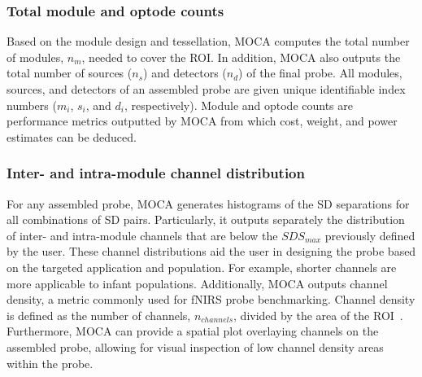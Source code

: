\subsubsection{Total module and optode counts}
Based on the module design and tessellation, \ac{MOCA} computes the total number of modules, $n_m$, needed to cover the \ac{ROI}. In addition, \ac{MOCA} also outputs the total number of sources ($n_s$) and detectors ($n_d$) of the final probe. All modules, sources, and detectors of an assembled probe are given unique identifiable index numbers ($m_i$, $s_i$, and $d_i$, respectively). Module and optode counts are performance metrics outputted by \ac{MOCA} from which cost, weight, and power estimates can be deduced.

\subsubsection{Inter- and intra-module channel distribution}
For any assembled probe, \ac{MOCA} generates histograms of the \ac{SD} separations for all combinations of \ac{SD} pairs. Particularly, it outputs separately the distribution of inter- and intra-module channels that are below the $SDS_{max}$ previously defined by the user. These channel distributions aid the user in designing the probe based on the targeted application and population. For example, shorter channels are more applicable to infant populations. Additionally, \ac{MOCA} outputs channel density, a metric commonly used for \ac{fNIRS} probe benchmarking. Channel density is defined as the number of channels, $n_{channels}$, divided by the area of the \ac{ROI}~\cite{Zhao2017}. Furthermore, \ac{MOCA} can provide a spatial plot overlaying channels on the assembled probe, allowing for visual inspection of low channel density areas within the probe. 

